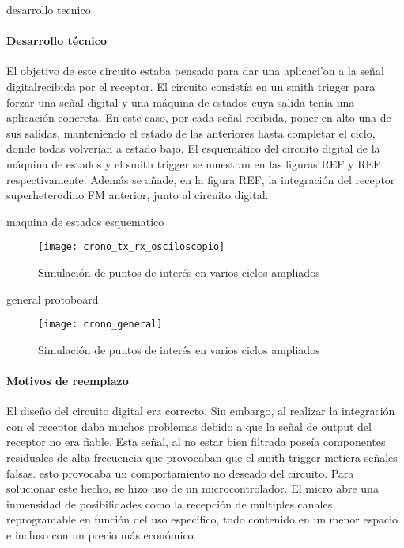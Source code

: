 desarrollo tecnico
\paragraph{Desarrollo técnico}
El objetivo de este circuito estaba pensado para dar una aplicaci'on a la señal digitalrecibida por el receptor. El circuito consistía en un smith trigger para forzar una señal digital y una máquina de estados cuya salida tenía una aplicación concreta. En este caso, por cada señal recibida, poner en alto una de sus salidas, manteniendo el estado de las anteriores hasta completar el ciclo, donde todas volverían a estado bajo. 
El esquemático del circuito digital de la máquina de estados y el smith trigger se muestran en las figuras REF y REF respectivamente.
Además se añade, en la figura REF, la integración del receptor superheterodino FM anterior, junto al circuito digital.

maquina de estados esquematico
\begin{figure}[h]
    \centering
    \texttt{[image: crono\_tx\_rx\_osciloscopio]}
    \caption{Simulación de puntos de interés en varios ciclos ampliados}
    \label{fig:simrx_zoom}
\end{figure}

general protoboard
\begin{figure}[h]
    \centering
    \texttt{[image: crono\_general]}
    \caption{Simulación de puntos de interés en varios ciclos ampliados}
    \label{fig:simrx_zoom}
\end{figure}

\paragraph{Motivos de reemplazo}
El diseño del circuito digital era correcto. Sin embargo, al realizar la integración con el receptor daba muchos problemas debido a que la señal de output del receptor no era fiable. Esta señal, al no estar bien filtrada poseía componentes residuales de alta frecuencia que provocaban que el smith trigger metiera señales falsas. esto provocaba un comportamiento no deseado del circuito. 
Para solucionar este hecho, se hizo uso de un microcontrolador. El micro abre una inmensidad de posibilidades como la recepci\'on de múltiples canales, reprogramable en función del uso específico, todo contenido en un menor espacio e incluso con un precio más económico.
